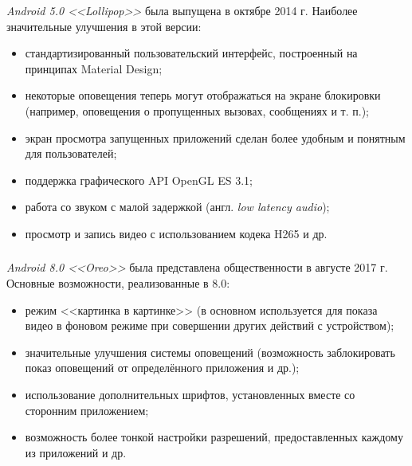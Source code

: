 \textit{Android 5.0 <<Lollipop>>} была выпущена в октябре 2014 г. \cite{android_release_notes}
Наиболее значительные улучшения в этой версии:
\begin{itemize}
	\item стандартизированный пользовательский интерфейс, построенный на принципах Material Design;
	\item некоторые оповещения теперь могут отображаться на экране блокировки (например, оповещения о пропущенных вызовах, сообщениях и т. п.);
	\item экран просмотра запущенных приложений сделан более удобным и понятным для пользователей;
	\item поддержка графического API OpenGL ES 3.1;
	\item работа со звуком с малой задержкой (англ. \textit{low latency audio});
	\item просмотр и запись видео с использованием кодека H265 и др. \cite{android_lollipop}
\end{itemize}


\subsubsection{}
\label{subsub:android_platform:history:oreo}

\textit{Android 8.0 <<Oreo>>} была представлена общественности в августе 2017 г. \cite{android_release_notes}
Основные возможности, реализованные в 8.0:
\begin{itemize}
	\item режим <<картинка в картинке>> (в основном используется для показа видео в фоновом режиме при совершении других действий с устройством);
	\item значительные улучшения системы оповещений (возможность заблокировать показ оповещений от определённого приложения и др.);
	\item использование дополнительных шрифтов, установленных вместе со сторонним приложением;
	\item возможность более тонкой настройки разрешений, предоставленных каждому из приложений и др. \cite{android_oreo}
\end{itemize}


\subsubsection{}
\label{subsub:android_platform:history:pie}

